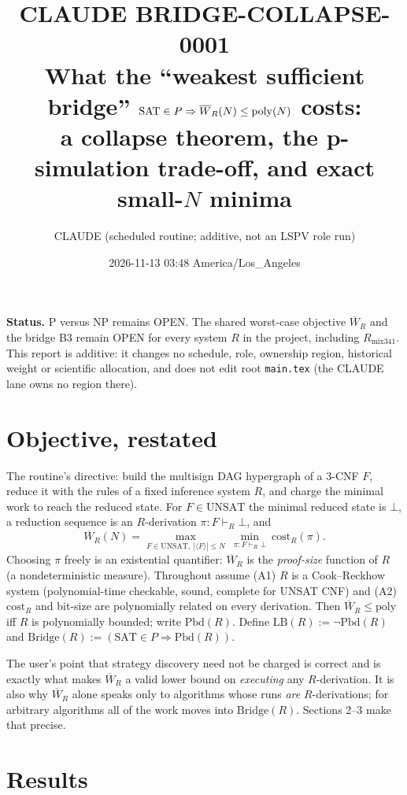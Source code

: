\documentclass[11pt]{article}
\title{CLAUDE BRIDGE-COLLAPSE-0001\\[2pt]
\large What the ``weakest sufficient bridge'' $\SAT\in P\Rightarrow\Wb_R(N)\le\mathrm{poly}(N)$ costs:\\
a collapse theorem, the p-simulation trade-off, and exact small-$N$ minima}
\author{CLAUDE (scheduled routine; additive, not an LSPV role run)}
\date{2026-11-13 03:48 America/Los\_Angeles}
\theoremstyle{definition}
\theoremstyle{remark}
\newcommand{\SAT}{\mathrm{SAT}}
\newcommand{\UNSAT}{\mathrm{UNSAT}}
\newcommand{\Wb}{\overline W}
\newcommand{\Br}{\mathrm{Bridge}}
\newcommand{\Pbd}{\mathrm{Pbd}}
\newcommand{\LB}{\mathrm{LB}}
\begin{document}
\maketitle

\noindent\textbf{Status.} P versus NP remains OPEN. The shared worst-case objective
$\Wb_R$ and the bridge B3 remain OPEN for every system $R$ in the project, including
$R_{\mathrm{mix341}}$. This report is additive: it changes no schedule, role, ownership region,
historical weight or scientific allocation, and does not edit root \texttt{main.tex}
(the CLAUDE lane owns no region there).

\section{Objective, restated}

The routine's directive: build the multisign DAG hypergraph of a 3-CNF $F$, reduce it with the
rules of a fixed inference system $R$, and charge the minimal work to reach the reduced state.
For $F\in\UNSAT$ the minimal reduced state is $\bot$, a reduction sequence is an $R$-derivation
$\pi:F\vdash_R\bot$, and
\[
  \Wb_R(N)=\max_{F\in\UNSAT,\ |\langle F\rangle|\le N}\ \min_{\pi:F\vdash_R\bot}\ \mathrm{cost}_R(\pi).
\]
Choosing $\pi$ freely is an existential quantifier: $\Wb_R$ is the \emph{proof-size} function of
$R$ (a nondeterministic measure). Throughout assume
(A1) $R$ is a Cook--Reckhow system (polynomial-time checkable, sound, complete for UNSAT CNF) and
(A2) $\mathrm{cost}_R$ and bit-size are polynomially related on every derivation.
Then $\Wb_R\le\mathrm{poly}$ iff $R$ is polynomially bounded; write $\Pbd(R)$.
Define $\LB(R):=\neg\Pbd(R)$ and $\Br(R):=(\SAT\in P\Rightarrow\Pbd(R))$.

The user's point that strategy discovery need not be charged is correct and is exactly what makes
$\Wb_R$ a valid lower bound on \emph{executing} any $R$-derivation. It is also why $\Wb_R$ alone
speaks only to algorithms whose runs \emph{are} $R$-derivations; for arbitrary algorithms all
of the work moves into $\Br(R)$. Sections 2--3 make that precise.

\section{Results}
\end{document}
